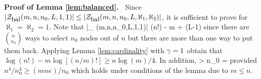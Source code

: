 \noindent
{\bf Proof of Lemma \ref{lem:balanced}.\ }
Since
$|{\cal{Z}}_{\mbox{\small bal}} (m,n,n_0,L,1,1)| \leq |{\cal{Z}}_{\mbox{\small bal}} (m,n,n_0,L,\aleph_1,\aleph_2)|$,
 it is sufficient to prove  for $\aleph_1 = \aleph_2=1$. 
%
Note that 
\bes 
\log|\calZ_{\bal} (m,n,n_0,L,1,1)| \geq  \log(n!) - m \log [(n/m)!] + (L-1) 
\ees
since there are ${n \choose n_0}$ ways to select $n_0$ nodes out of $n$ but there are more than 
one way to put them back. Applying Lemma \ref{lem:cardinality} with $\gamma =1$ obtain that
$\log(n!) - m \log [(n/m)!] \geq n \log(m)/4$. In addition,
\bes
{} > n_0 \log \lkr {}\rkr =  \log \lkr {}\rkr
\geq {} \log \lkr {}\rkr
\ees
provided $n^4/n_0^4 \geq (mne)/n_0$ which holds under conditions of the lemma due to $m \leq n$.
\\




